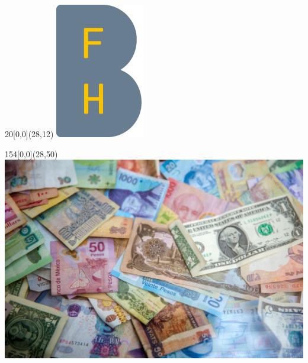%
%

\begin{titlepage}


\setlength{\unitlength}{1mm}
\begin{textblock}{20}[0,0](28,12)
	\includegraphics[scale=1.0]{images/BFH_Logo_B.png}
\end{textblock}


\begin{textblock}{154}[0,0](28,50)
	\includegraphics[width=\linewidth]{images/currencies.jpg}			%
\end{textblock}


\color{black}

\begin{flushleft}


\end{flushleft}
\end{titlepage}
